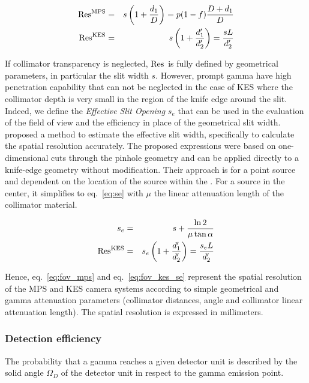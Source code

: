 \documentclass[a4paper,english,12pt]{article}
\begin{document}
\begin{eqnarray}
  \label{eq:fov_mps}
  \textrm{Res}_{}^{\textrm{MPS}} & = & s\left(1+ \frac{d_1}{D}\right) = p(1-f) \frac{D+d_1}{D} \\
  \label{eq:fov_kes}
   \textrm{Res}_{}^{\textrm{KES}} & = & s\left(1+ \frac{d_1'}{d_2'}\right) = \frac{sL}{d_2'}
\end{eqnarray}

If collimator transparency is neglected, $\textrm{Res}_{}$ is fully defined by geometrical parameters, in particular the slit width $s$. However, prompt gamma have high penetration capability that can not be neglected in the case of KES where the collimator depth is very small in the region of the knife edge around the slit. Indeed, we define the \textit{Effective Slit Opening} $s_e$ that can be used in the evaluation of the field of view and the efficiency in place of the geometrical slit width. \cite{Metzler2005}
proposed a method to estimate the effective slit width, specifically to calculate
the spatial resolution accurately. The proposed expressions were based on
one-dimensional cuts through the pinhole geometry and can be applied directly to
a knife-edge geometry without modification. Their approach is for a point source
and dependent on the location of the source within the \FOV. For a source in the
center, it simplifies to eq.~\ref{eq:se} with $\mu$ the linear attenuation
length of the collimator material.

\begin{eqnarray}
  s_e & = & s + \frac{\ln2}{\mu\tan\alpha}   \label{eq:se} \\
   \textrm{Res}_{}^{\textrm{KES}} & = & s_e\left(1+ \frac{d_1'}{d_2'}\right) = \frac{s_eL}{d_2'}          
  \label{eq:fov_kes_se}
\end{eqnarray}

Hence, eq.~\ref{eq:fov_mps} and eq.~\ref{eq:fov_kes_se} represent the spatial resolution of the MPS and KES camera systems according to simple geometrical and gamma attenuation parameters (collimator distances, angle and collimator linear attenuation length). The spatial resolution is expressed in millimeters. 

\subsubsection{Detection efficiency}

The probability that a gamma reaches a given detector unit is described by the solid angle $\Omega_D$ of the detector unit in respect to the gamma emission point.
\end{document}
